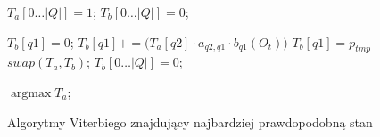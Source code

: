 \documentclass[shortabstract, mgr]{iithesis}
\DeclareMathOperator*{\argmax}{\arg\max}   %
\begin{document}
		  \begin{figure}
			  \begin{algorithmic}[1]
		  		
		  		
		  	  	  \STATE $T_a[0 \ldots |Q|] = 1$;
		  		  \STATE $T_b[0 \ldots |Q|] = 0$;
		  		
				  		  \STATE $T_b[q1] = 0$;
					  		  \STATE $T_b[q1] += \bigg( T_a[q2]\cdot a_{q2,q1}\cdot b_{q1}(O_t) \bigg)$					  		  
				  		  \ENDFOR
				  		  \STATE $T_b[q1] = p_{tmp}$
			  		  \ENDFOR
			  		  \STATE $swap(T_a, T_b)$;
			  		  \STATE $T_b[0 \ldots |Q|] = 0$;
		  		  \ENDFOR
		  		
		  		  \RETURN $\argmax{T_a}$;
			  \end{algorithmic}
			  \caption{Algorytmy Viterbiego znajdujący najbardziej prawdopodobną stan}
		  	  \label{alg:viterbi2}
		  \end{figure}	   
		   
\end{document}
